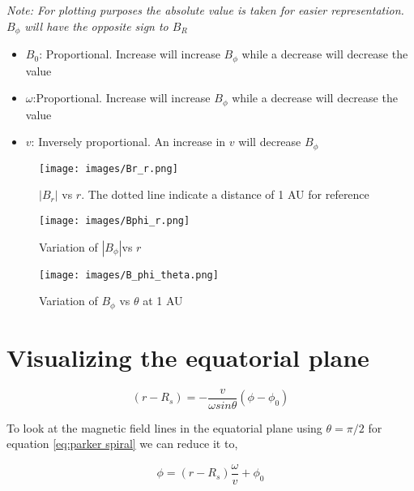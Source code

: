 \documentclass[letterpaper,skipsamekey,12pt,english]{article}
\begin{document}
\textit{Note: For plotting purposes the absolute value is taken for easier representation.  $B_\phi$ will have the opposite sign to $B_R$}

\begin{itemize}[noitemsep]
    \item $B_0$: Proportional. Increase will increase $B_\phi$ while a decrease will decrease the value
    \item $\omega$:Proportional. Increase will increase $B_\phi$ while a decrease will decrease the value
    \item $v$: Inversely proportional. An increase in $v$ will decrease $B_\phi$
\end{itemize}

\begin{figure}
    \centering
    \texttt{[image: images/Br\_r.png]}
    \caption{$|B_r|$ vs $r$. The dotted line indicate a distance of 1 AU for reference}
    \label{fig:br_r}
\end{figure}

\begin{figure}
    \centering
    \texttt{[image: images/Bphi\_r.png]}
    \caption{Variation of $|B_\phi|$vs $r$}
    \label{fig:B_phi_r}
\end{figure}

\begin{figure}
    \centering
    \texttt{[image: images/B\_phi\_theta.png]}
    \caption{Variation of $B_\phi$ vs $\theta$ at 1 AU}
    \label{fig:B_phi_theta}
\end{figure}


 
\break

\section{Visualizing the equatorial plane}

\begin{equation}
    \label{eq:parker spiral}
    (r-R_s) = - \frac{v}{\omega sin\theta}(\phi - \phi_0)
\end{equation} 

To look at the magnetic field lines in the equatorial plane using $\theta = \pi/2$ for equation \ref{eq:parker spiral} we can reduce it to,

\begin{equation}
 \label{eq:xy_ps}
\phi = (r - R_s)\frac{\omega}{v} + \phi_0
\end{equation}
\end{document}
